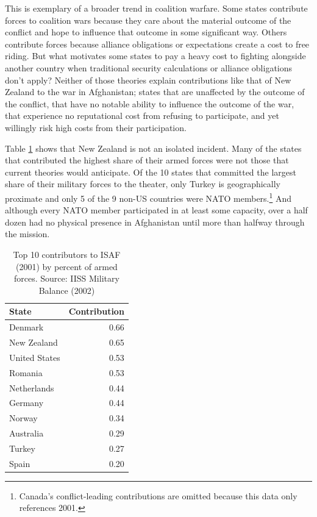 \documentclass[12pt,letterpaper]{article}
\begin{document}
	This is exemplary of a broader trend in coalition warfare. Some states contribute forces to coalition wars because they care about the material outcome of the conflict and hope to influence that outcome in some significant way. Others contribute forces because alliance obligations or expectations create a cost to free riding. But what motivates some states to pay a heavy cost to fighting alongside another country when traditional security calculations or alliance obligations don't apply? Neither of those theories explain contributions like that of New Zealand to the war in Afghanistan; states that are unaffected by the outcome of the conflict, that have no notable ability to influence the outcome of the war, that experience no reputational cost from refusing to participate, and yet willingly risk high costs from their participation.
	
	Table \ref{table:2001_top} shows that New Zealand is not an isolated incident. Many of the states that contributed the highest share of their armed forces were not those that current theories would anticipate. Of the 10 states that committed the largest share of their military forces to the theater, only Turkey is geographically proximate and only 5 of the 9 non-US countries were NATO members.\footnote{Canada's conflict-leading contributions are omitted because this data only references 2001.} And although every NATO member participated in at least some capacity, over a half dozen had no physical presence in Afghanistan until more than halfway through the mission.

	\begin{table}[ht]
		\centering
		\begin{tabular}{|lr|}
			\hline
			\textbf{State} & \textbf{Contribution} \\
			\hline
			Denmark & 0.66 \\
			New Zealand & 0.65 \\
			United States & 0.53 \\
			Romania & 0.53 \\
			Netherlands & 0.44 \\
			Germany & 0.44 \\
			Norway & 0.34 \\
			Australia & 0.29 \\
			Turkey & 0.27 \\
			Spain & 0.20 \\
			\hline
		\end{tabular}
	\caption{Top 10 contributors to ISAF (2001) by percent of armed forces. Source: IISS Military Balance (2002)}
	\label{table:2001_top}
	\end{table}
\end{document}
